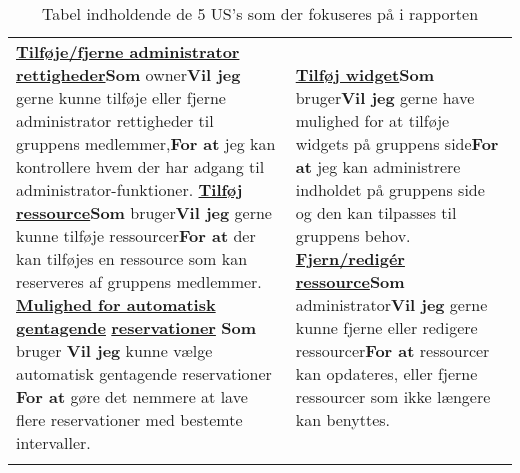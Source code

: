 \begin{table}[H]
\begin{tabular}{p{2.5in}p{2.5in}}
\textbf{\underline{Tilføje/fjerne administrator rettigheder}}\newline \textbf{Som} owner\newline \textbf{Vil jeg} gerne kunne tilføje eller fjerne administrator rettigheder til gruppens medlemmer,\newline \textbf{For at} jeg kan kontrollere hvem der har adgang til administrator-funktioner.
\newline
\newline
\textbf{\underline{Tilføj ressource}}\newline \textbf{Som} bruger\newline \textbf{Vil jeg} gerne kunne tilføje ressourcer\newline \textbf{For at} der kan tilføjes en ressource som kan reserveres af gruppens medlemmer.
\newline
\newline
\textbf{\underline{Mulighed for automatisk gentagende}}
\textbf{\underline{reservationer}}
\newline \textbf{Som} bruger
\newline \textbf{Vil jeg} kunne vælge automatisk gentagende reservationer
\newline \textbf{For at} gøre det nemmere at lave flere reservationer med bestemte intervaller.
& 
\textbf{\underline{Tilføj widget}}\newline \textbf{Som} bruger\newline \textbf{Vil jeg} gerne have mulighed for at tilføje widgets på gruppens side\newline \textbf{For at} jeg kan administrere indholdet på gruppens side og den kan tilpasses til gruppens behov.
\newline
\newline
\textbf{\underline{Fjern/redigér ressource}}\newline \textbf{Som} administrator\newline \textbf{Vil jeg} gerne kunne fjerne eller redigere ressourcer\newline \textbf{For at} ressourcer kan opdateres, eller fjerne ressourcer som ikke længere kan benyttes. \\\\
\end{tabular}
\caption{Tabel indholdende de 5 US's som der fokuseres på i rapporten}
\label{tab:US_rep}
\end{table}









